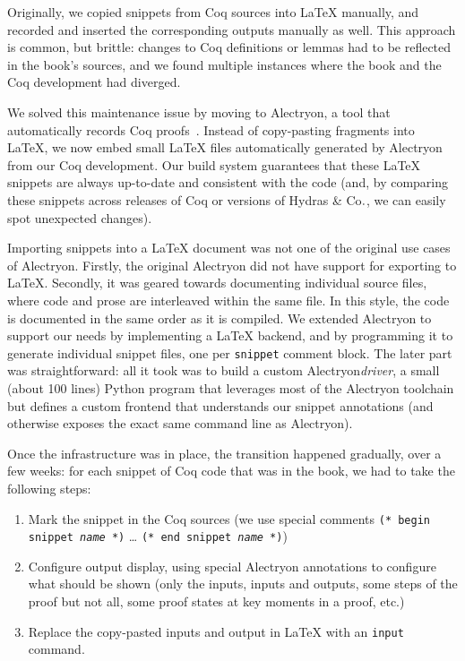 \documentclass{easychair}
\newcommand{\coq}{Coq\xspace}
\newcommand{\alectr}{Alectryon\xspace}
\newcommand{\Hydras}{Hydras \& Co$\text.$\xspace}
\begin{document}
Originally, we copied snippets from \coq sources into LaTeX manually, and recorded and inserted the corresponding outputs manually as well.  This approach is common, but brittle: changes to \coq definitions or lemmas had to be reflected in the book's sources, and we found multiple instances where the book and the \coq development had diverged.
 
We solved this maintenance issue by moving to \alectr, a tool that automatically records \coq proofs~\cite{alectryongithub}.  Instead of copy-pasting fragments into LaTeX, we now embed small LaTeX files automatically generated by \alectr from our \coq development.  Our build system guarantees that these LaTeX snippets are always up-to-date and consistent with the code (and, by comparing these snippets across releases of \coq or versions of \Hydras, we can easily spot unexpected changes).

Importing snippets into a LaTeX document was not one of the original use cases of Alectryon. Firstly, the original Alectryon did not have support for exporting to LaTeX. Secondly, it was geared towards documenting individual source files, where code and prose are interleaved within the same file. In this style, the code is documented in the same order as it is compiled.
We extended \alectr to support our needs by implementing a LaTeX backend, and by programming it to generate individual snippet files, one per \texttt{snippet} comment block.  The later part was straightforward: all it took was to build a custom \alectr \textit{driver}, a small (about 100 lines) Python program that leverages most of the \alectr toolchain but defines a custom frontend that understands our snippet annotations (and otherwise exposes the exact same command line as \alectr).

Once the infrastructure was in place, the transition happened gradually, over a few weeks: for each snippet of \coq code that was in the book, we had to take the following steps:

\begin{enumerate}
\item Mark the snippet in the \coq sources (we use special comments \texttt{(* begin snippet \textit{name} *)} … \texttt{(* end snippet \textit{name} *)})
\item Configure output display, using special \alectr annotations to configure what should be shown (only the inputs, inputs and outputs, some steps of the proof but not all, some proof states at key moments in a proof, etc.)
\item Replace the copy-pasted inputs and output in LaTeX with an \texttt{input} command.
\end{enumerate}
\end{document}
